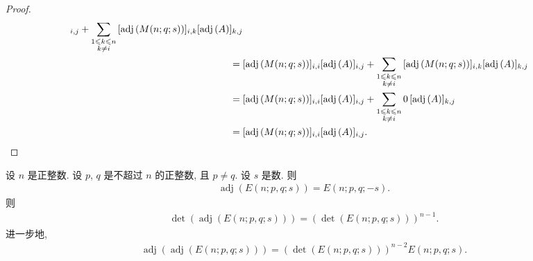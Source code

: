 \documentclass[../libro.tex]{subfiles}
\begin{document}
\begin{proof}
\begin{align*}
        [\operatorname{adj} {(A)}]_{i,j}
        +
        \sum_{\substack{1 \leq k \leq n \\ k \neq i}}
        {[\operatorname{adj} {(M(n; q; s))}]_{i,k}
        [\operatorname{adj} {(A)}]_{k,j}}
        \\
        = {} &
        [\operatorname{adj} {(M(n; q; s))}]_{i,i}
        [\operatorname{adj} {(A)}]_{i,j}
        +
        \sum_{\substack{1 \leq k \leq n \\ k \neq i}}
        {[\operatorname{adj} {(M(n; q; s))}]_{i,k}
        [\operatorname{adj} {(A)}]_{k,j}}
        \\
        = {} &
        [\operatorname{adj} {(M(n; q; s))}]_{i,i}
        [\operatorname{adj} {(A)}]_{i,j}
        +
        \sum_{\substack{1 \leq k \leq n \\ k \neq i}}
        {0\, [\operatorname{adj} {(A)}]_{k,j}}
        \\
        = {} &
        [\operatorname{adj} {(M(n; q; s))}]_{i,i}
        [\operatorname{adj} {(A)}]_{i,j}.
        \qedhere
    \end{align*}
\end{proof}

\begin{theorem}
    设 \(n\) 是正整数.
    设 \(p\), \(q\) 是不超过 \(n\) 的正整数, 且 \(p \neq q\).
    设 \(s\) 是数.
    则
    \begin{align*}
        \operatorname{adj} {(E(n; p, q; s))}
        = E(n; p, q; -s).
    \end{align*}
    则
    \begin{align*}
        \det {(\operatorname{adj} {(E(n; p, q; s))})}
        = (\det {(E(n; p, q; s))})^{n-1}.
    \end{align*}
    进一步地,
    \begin{align*}
        \operatorname{adj} {(
                \operatorname{adj} {(E(n; p, q; s))}
        )}
        = (\det {(E(n; p, q; s))})^{n-2} E(n; p, q; s).
    \end{align*}
\end{theorem}
\end{document}
